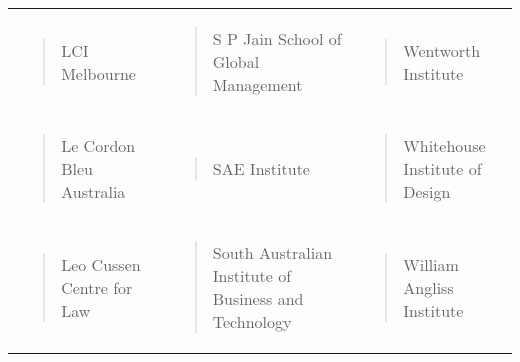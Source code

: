 \documentclass[]{book}
\begin{document}
\begin{longtable}[]{@{}lll@{}}
\begin{minipage}[t]{0.32\columnwidth}\raggedright
\begin{quote}
LCI Melbourne
\end{quote}\strut
\end{minipage} & \begin{minipage}[t]{0.32\columnwidth}\raggedright
\begin{quote}
S P Jain School of Global Management
\end{quote}\strut
\end{minipage} & \begin{minipage}[t]{0.32\columnwidth}\raggedright
\begin{quote}
Wentworth Institute
\end{quote}\strut
\end{minipage}\tabularnewline
\begin{minipage}[t]{0.32\columnwidth}\raggedright
\begin{quote}
Le Cordon Bleu Australia
\end{quote}\strut
\end{minipage} & \begin{minipage}[t]{0.32\columnwidth}\raggedright
\begin{quote}
SAE Institute
\end{quote}\strut
\end{minipage} & \begin{minipage}[t]{0.32\columnwidth}\raggedright
\begin{quote}
Whitehouse Institute of Design
\end{quote}\strut
\end{minipage}\tabularnewline
\begin{minipage}[t]{0.32\columnwidth}\raggedright
\begin{quote}
Leo Cussen Centre for Law
\end{quote}\strut
\end{minipage} & \begin{minipage}[t]{0.32\columnwidth}\raggedright
\begin{quote}
South Australian Institute of Business and Technology
\end{quote}\strut
\end{minipage} & \begin{minipage}[t]{0.32\columnwidth}\raggedright
\begin{quote}
William Angliss Institute
\end{quote}\strut
\end{minipage}\tabularnewline
\bottomrule
\end{longtable}
\end{document}
